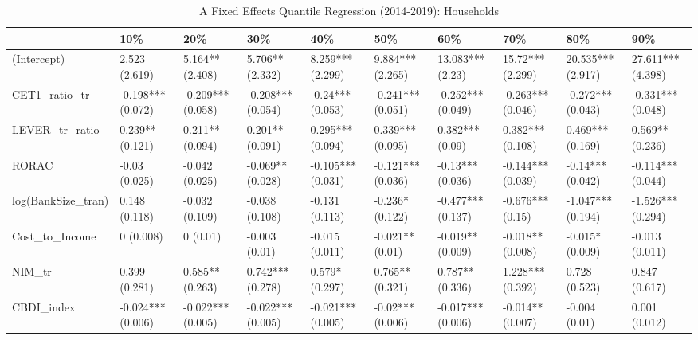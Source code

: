 \begin{table}[ht]
\centering
\caption{A Fixed Effects Quantile Regression (2014-2019): Households} 
\begingroup\small
\begin{tabular}{llllllllll}
  \toprule
 & 10\% & 20\% & 30\% & 40\% & 50\% & 60\% & 70\% & 80\% & 90\% \\ 
  \midrule
(Intercept) & 2.523 (2.619) & 5.164** (2.408) & 5.706** (2.332) & 8.259*** (2.299) & 9.884*** (2.265) & 13.083*** (2.23) & 15.72*** (2.299) & 20.535*** (2.917) & 27.611*** (4.398) \\ 
  CET1\_ratio\_tr & -0.198*** (0.072) & -0.209*** (0.058) & -0.208*** (0.054) & -0.24*** (0.053) & -0.241*** (0.051) & -0.252*** (0.049) & -0.263*** (0.046) & -0.272*** (0.043) & -0.331*** (0.048) \\ 
  LEVER\_tr\_ratio & 0.239** (0.121) & 0.211** (0.094) & 0.201** (0.091) & 0.295*** (0.094) & 0.339*** (0.095) & 0.382*** (0.09) & 0.382*** (0.108) & 0.469*** (0.169) & 0.569** (0.236) \\ 
  RORAC & -0.03 (0.025) & -0.042 (0.025) & -0.069** (0.028) & -0.105*** (0.031) & -0.121*** (0.036) & -0.13*** (0.036) & -0.144*** (0.039) & -0.14*** (0.042) & -0.114*** (0.044) \\ 
  log(BankSize\_tran) & 0.148 (0.118) & -0.032 (0.109) & -0.038 (0.108) & -0.131 (0.113) & -0.236* (0.122) & -0.477*** (0.137) & -0.676*** (0.15) & -1.047*** (0.194) & -1.526*** (0.294) \\ 
  Cost\_to\_Income & 0 (0.008) & 0 (0.01) & -0.003 (0.01) & -0.015 (0.011) & -0.021** (0.01) & -0.019** (0.009) & -0.018** (0.008) & -0.015* (0.009) & -0.013 (0.011) \\ 
  NIM\_tr & 0.399 (0.281) & 0.585** (0.263) & 0.742*** (0.278) & 0.579* (0.297) & 0.765** (0.321) & 0.787** (0.336) & 1.228*** (0.392) & 0.728 (0.523) & 0.847 (0.617) \\ 
  CBDI\_index & -0.024*** (0.006) & -0.022*** (0.005) & -0.022*** (0.005) & -0.021*** (0.005) & -0.02*** (0.006) & -0.017*** (0.006) & -0.014** (0.007) & -0.004 (0.01) & 0.001 (0.012) \\ 
   \bottomrule
\end{tabular}
\endgroup
\end{table}
